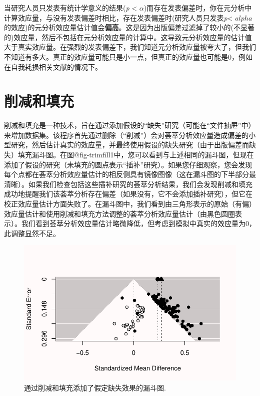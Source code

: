 \documentclass[
  letterpaper,
  DIV=11,
  numbers=noendperiod]{scrreprt}
\begin{document}
当研究人员只发表有统计学意义的结果(\emph{p} \textless{}
\(\alpha\))而存在发表偏差时，你在元分析中计算效应量，与没有发表偏差时相比，存在发表偏差时(研究人员只发表\emph{p}\textless{}
\(alpha\)的效应)的元分析效应量估计值会\textbf{偏高}。这是因为出版偏差过滤掉了较小的(不显著的)效应量，然后不包括在元分析效应量的计算中。这导致元分析效应量的估计值大于真实效应量。在强烈的发表偏差下，我们知道元分析效应量被夸大了，但我们不知道有多大。真正的效应量可能只是小一点，但真正的效应量也可能是0，例如在自我耗损相关文献的情况下。

\hypertarget{ux524aux51cfux548cux586bux5145}{%
\section{削减和填充}\label{ux524aux51cfux548cux586bux5145}}

削减和填充是一种技术，旨在通过添加假设的``缺失''研究（可能在``文件抽屉''中）来增加数据集。该程序首先通过删除（``削减''）会对荟萃分析效应量造成偏差的小型研究，然后估计真实的效应量，并最终使用假设的缺失研究（由于出版偏差而缺失）填充漏斗图。在图@fig-trimfill1中，您可以看到与上述相同的漏斗图，但现在添加了假设的研究（未填充的圆点表示``插补''研究）。如果您仔细观察，您会发现每个点都在荟萃分析效应量估计的相反侧具有镜像图像（这在漏斗图的下半部分最清晰）。如果我们检查包括这些插补研究的荟萃分析结果，我们会发现削减和填充成功地提醒我们该荟萃分析存在偏差（如果没有，它不会添加插补研究），但它在校正效应量估计方面失败了。在漏斗图中，我们看到由三角形表示的原始（有偏）效应量估计和使用削减和填充方法调整的荟萃分析效应量估计（由黑色圆圈表示）。我们看到荟萃分析效应量估计略微降低，但考虑到模拟中真实的效应量为0，此调整显然不足。

\begin{figure}

{\centering \includegraphics[width=1\textwidth,height=\textheight]{12-bias_files/figure-pdf/fig-trimfill1-1.pdf}

}

\caption{\label{fig-trimfill1}通过削减和填充添加了假定缺失效果的漏斗图.}

\end{figure}
\end{document}
